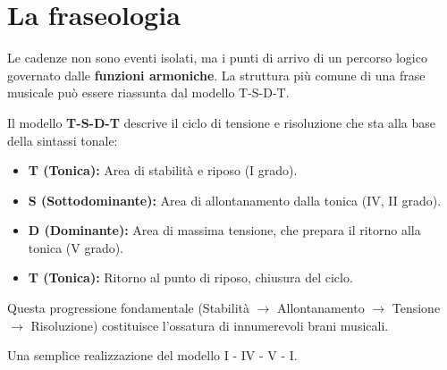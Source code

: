 	\section{La fraseologia}
	\label{sec:fraseologia}
	
	Le cadenze non sono eventi isolati, ma i punti di arrivo di un percorso logico governato dalle \textbf{funzioni armoniche}. La struttura più comune di una frase musicale può essere riassunta dal modello T-S-D-T.
	
	\begin{regola}
		\label{reg:tsdt}
		Il modello \textbf{T-S-D-T} descrive il ciclo di tensione e risoluzione che sta alla base della sintassi tonale:
		\begin{itemize}
			\item \textbf{T (Tonica):} Area di stabilità e riposo (I grado).
			\item \textbf{S (Sottodominante):} Area di allontanamento dalla tonica (IV, II grado).
			\item \textbf{D (Dominante):} Area di massima tensione, che prepara il ritorno alla tonica (V grado).
			\item \textbf{T (Tonica):} Ritorno al punto di riposo, chiusura del ciclo.
		\end{itemize}
		Questa progressione fondamentale (Stabilità $\rightarrow$ Allontanamento $\rightarrow$ Tensione $\rightarrow$ Risoluzione) costituisce l'ossatura di innumerevoli brani musicali.
	\end{regola}
	
	\begin{esempio}
		\label{ex:tsdt}
		Una semplice realizzazione del modello I - IV - V - I.
	\end{esempio}
	
	
